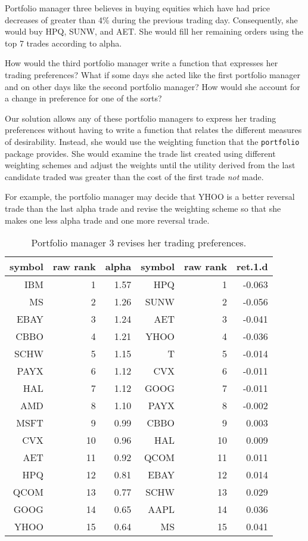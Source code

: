 \documentclass{article}
\begin{document}
Portfolio manager three believes in buying equities which have had
price decreases of greater than 4\% during the previous trading day.
Consequently, she would buy HPQ, SUNW, and AET.  She would fill her
remaining orders using the top 7 trades according to alpha.

How would the third portfolio manager write a function that expresses
her trading preferences?  What if some days she acted like the first
portfolio manager and on other days like the second portfolio manager?
How would she account for a change in preference for one of the sorts?

Our solution allows any of these portfolio managers to express her
trading preferences without having to write a function that relates
the different measures of desirability.  Instead, she would use the
weighting function that the \texttt{portfolio} package provides.  She
would examine the trade list created using different weighting schemes
and adjust the weights until the  utility derived from the
last candidate traded was greater than the  cost of the first
trade \emph{not} made.

For example, the portfolio manager may decide that YHOO is a better
reversal trade than the last alpha trade and revise the weighting
scheme so that she makes one less alpha trade and one more reversal
trade.

\begin{table}[!htbp]
  \begin{tabular}[c]{|r|r|r|r|r|r|}
    \hline
    symbol & raw rank & alpha & symbol & raw rank  & ret.1.d \\
      \hline
     IBM   &  1  & 1.57  &  HPQ &  1 & -0.063 \\
     MS    &  2  & 1.26  & SUNW &  2 & -0.056 \\
     EBAY  &  3  & 1.24  &  AET &  3 & -0.041 \\ 
     CBBO  &  4  & 1.21  & YHOO &  4 & -0.036 \\ \cline{5-5}
     SCHW  &  5  & 1.15  &    T &  5 & -0.014 \\ 
     PAYX  &  6  & 1.12  &  CVX &  6 & -0.011 \\ \cline{2-2}
     HAL   &  7  & 1.12  & GOOG &  7 & -0.011 \\ 
     AMD   &  8  & 1.10  & PAYX &  8 & -0.002 \\
     MSFT  &  9  & 0.99  & CBBO &  9 &  0.003 \\
     CVX   & 10  & 0.96  &  HAL & 10 &  0.009 \\
     AET   & 11  & 0.92  & QCOM & 11 &  0.011 \\
     HPQ   & 12  & 0.81  & EBAY & 12 &  0.014 \\
     QCOM  & 13  & 0.77  & SCHW & 13 &  0.029 \\
     GOOG  & 14  & 0.65  & AAPL & 14 &  0.036 \\
     YHOO  & 15  & 0.64  &   MS & 15 &  0.041 \\
     \hline  
  \end{tabular}
  \caption[Trading Preferences II]{Portfolio manager 3 revises her
  trading preferences.\label{theory_table_2}}
\end{table}
\end{document}
